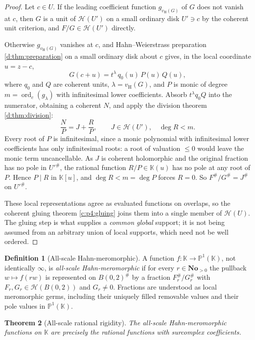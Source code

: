 \documentclass[11pt,a4paper]{article}
\numberwithin{equation}{section}
\newtheorem{theorem}{Theorem}[section]
\theoremstyle{definition}
\newtheorem{definition}[theorem]{Definition}
\theoremstyle{remark}
\theoremstyle{plain}
\newcommand{\K}{\mathbb K}
\newcommand{\No}{\mathbf{No}}
\DeclareMathOperator{\ord}{ord}
\newcommand{\halo}[1]{#1^{\#}}
\newcommand{\ev}[1]{#1^{\#}}
\newcommand{\Hc}{\mathcal H}
\newcommand{\vH}{v_{\mathrm H}}
\begin{document}
\begin{proof}
Let $c\in U$.  If the leading coefficient function $g_{\vH(G)}$ of $G$
does not vanish at $c$, then $G$ is a unit of $\Hc(U')$ on a small
ordinary disk $U'\ni c$ by the coherent unit criterion, and
$F/G\in\Hc(U')$ directly.

Otherwise $g_{\vH(G)}$ vanishes at $c$, and Hahn--Weierstrass
preparation \ref{d:thm:preparation} on a small ordinary disk about $c$
gives, in the local coordinate $u=z-c$,
\[
 G(c+u)=t^{\lambda}\,q_{0}(u)\,P(u)\,Q(u),
\]
where $q_{0}$ and $Q$ are coherent units, $\lambda=\vH(G)$, and $P$ is
monic of degree $m=\ord_{c}(g_{\lambda})$ with infinitesimal lower
coefficients.  Absorb $t^{\lambda}q_{0}Q$ into the numerator, obtaining
a coherent $N$, and apply the division theorem
\ref{d:thm:division}:
\[
 \frac{N}{P}=J+\frac{R}{P},\qquad J\in\Hc(U'),\quad
 \deg R<m .
\]
Every root of $P$ is infinitesimal, since a monic polynomial with
infinitesimal lower coefficients has only infinitesimal roots: a root of
valuation $\le0$ would leave the monic term uncancellable.  As $J$ is
coherent holomorphic and the original fraction has no pole in $\halo{U'}$,
the rational function $R/P\in\K(u)$ has no pole at any root of $P$.
Hence $P\mid R$ in $\K[u]$, and $\deg R<m=\deg P$ forces $R=0$.  So
$\ev F/\ev G=\ev J$ on $\halo{U'}$.

These local representations agree as evaluated functions on overlaps, so
the coherent gluing theorem \ref{c:p4:gluing} joins them into a single
member of $\Hc(U)$.  The gluing step is what supplies a \emph{common
global} support; it is not being assumed from an arbitrary union of
local supports, which need not be well ordered.
\end{proof}

\begin{definition}[All-scale Hahn-meromorphic]\label{f:def-allscalemero}
A function $f:\K\to\mathbb P^{1}(\K)$, not identically $\infty$, is
\emph{all-scale Hahn-meromorphic} if for every $r\in\No_{>0}$ the
pullback $w\mapsto f(rw)$ is represented on $\halo{B(0,2)}$ by a
fraction $\ev{F_{r}}/\ev{G_{r}}$ with $F_{r},G_{r}\in\Hc(B(0,2))$ and
$G_{r}\ne0$.  Fractions are understood as local meromorphic germs,
including their uniquely filled removable values and their pole values
in $\mathbb P^{1}(\K)$.
\end{definition}

\begin{theorem}[All-scale rational rigidity]\label{f:thm-rationalrigidity}
The all-scale Hahn-meromorphic functions on $\K$ are precisely the
rational functions with surcomplex coefficients.
\end{theorem}
\end{document}
